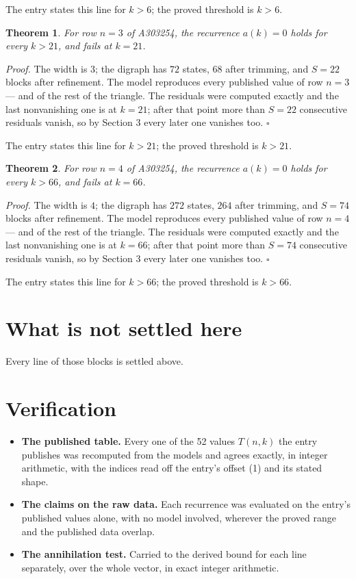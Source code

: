 \documentclass[11pt]{article}
\newtheorem{theorem}{Theorem}
\theoremstyle{definition}
\begin{document}
The entry states this line for $k > 6$; the proved threshold is $k > 6$.

\begin{theorem} For row $n = 3$ of A303254, the recurrence $a(k) = 0$ holds for every $k > 21$, and fails at $k = 21$.\end{theorem}

{\itshape Proof.} The width is $3$; the digraph has $72$ states, $68$ after trimming, and $S = 22$ blocks after refinement. The model reproduces every published value of row $n = 3$ --- and of the rest of the triangle. The residuals were computed exactly and the last nonvanishing one is at $k = 21$; after that point more than $S = 22$ consecutive residuals vanish, so by Section 3 every later one vanishes too. $\square$

The entry states this line for $k > 21$; the proved threshold is $k > 21$.

\begin{theorem} For row $n = 4$ of A303254, the recurrence $a(k) = 0$ holds for every $k > 66$, and fails at $k = 66$.\end{theorem}

{\itshape Proof.} The width is $4$; the digraph has $272$ states, $264$ after trimming, and $S = 74$ blocks after refinement. The model reproduces every published value of row $n = 4$ --- and of the rest of the triangle. The residuals were computed exactly and the last nonvanishing one is at $k = 66$; after that point more than $S = 74$ consecutive residuals vanish, so by Section 3 every later one vanishes too. $\square$

The entry states this line for $k > 66$; the proved threshold is $k > 66$.

\section{What is not settled here}

Every line of those blocks is settled above.

\section{Verification}

\begin{itemize}

\item {\bfseries The published table.} Every one of the 52 values $T(n,k)$ the entry publishes was recomputed from the models and agrees exactly, in integer arithmetic, with the indices read off the entry's offset (1) and its stated shape.

\item {\bfseries The claims on the raw data.} Each recurrence was evaluated on the entry's published values alone, with no model involved, wherever the proved range and the published data overlap.

\item {\bfseries The annihilation test.} Carried to the derived bound for each line separately, over the whole vector, in exact integer arithmetic.

\end{itemize}
\end{document}
